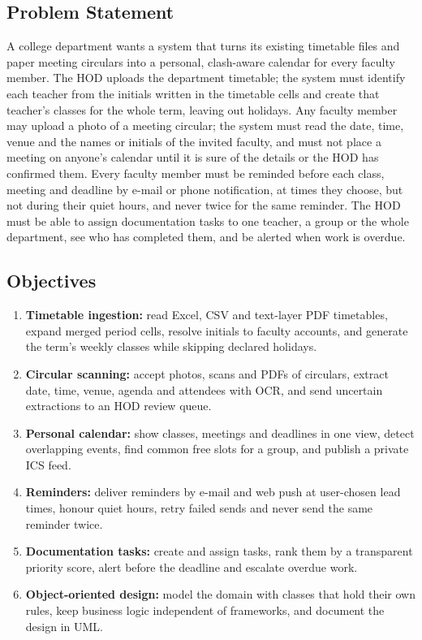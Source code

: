 
\subsection{Problem Statement}
A college department wants a system that turns its existing timetable files and paper meeting circulars into a personal, clash-aware calendar for every faculty member. The HOD uploads the department timetable; the system must identify each teacher from the initials written in the timetable cells and create that teacher's classes for the whole term, leaving out holidays. Any faculty member may upload a photo of a meeting circular; the system must read the date, time, venue and the names or initials of the invited faculty, and must not place a meeting on anyone's calendar until it is sure of the details or the HOD has confirmed them. Every faculty member must be reminded before each class, meeting and deadline by e-mail or phone notification, at times they choose, but not during their quiet hours, and never twice for the same reminder. The HOD must be able to assign documentation tasks to one teacher, a group or the whole department, see who has completed them, and be alerted when work is overdue.

\subsection{Objectives}
\begin{enumerate}
  \item \textbf{Timetable ingestion:} read Excel, CSV and text-layer PDF timetables, expand merged period cells, resolve initials to faculty accounts, and generate the term's weekly classes while skipping declared holidays.
  \item \textbf{Circular scanning:} accept photos, scans and PDFs of circulars, extract date, time, venue, agenda and attendees with OCR, and send uncertain extractions to an HOD review queue.
  \item \textbf{Personal calendar:} show classes, meetings and deadlines in one view, detect overlapping events, find common free slots for a group, and publish a private ICS feed.
  \item \textbf{Reminders:} deliver reminders by e-mail and web push at user-chosen lead times, honour quiet hours, retry failed sends and never send the same reminder twice.
  \item \textbf{Documentation tasks:} create and assign tasks, rank them by a transparent priority score, alert before the deadline and escalate overdue work.
  \item \textbf{Object-oriented design:} model the domain with classes that hold their own rules, keep business logic independent of frameworks, and document the design in UML.
\end{enumerate}

